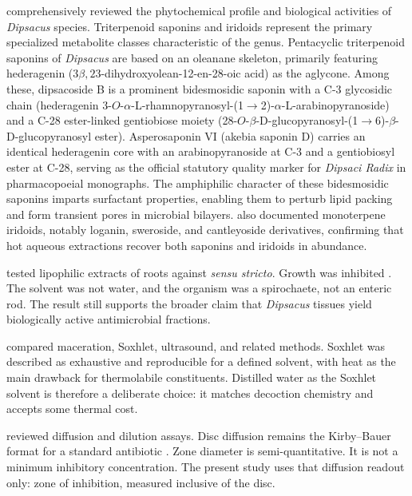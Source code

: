 \citet{zhao2011phytochemicals} comprehensively reviewed the phytochemical profile and biological activities of \textit{Dipsacus} species. Triterpenoid saponins and iridoids represent the primary specialized metabolite classes characteristic of the genus. Pentacyclic triterpenoid saponins of \textit{Dipsacus} are based on an oleanane skeleton, primarily featuring hederagenin ($3\beta,23$-dihydroxyolean-12-en-28-oic acid) as the aglycone. Among these, dipsacoside B is a prominent bidesmosidic saponin with a C-3 glycosidic chain (hederagenin 3-$O$-$\alpha$-L-rhamnopyranosyl-(1$\to$2)-$\alpha$-L-arabinopyranoside) and a C-28 ester-linked gentiobiose moiety (28-$O$-$\beta$-D-glucopyranosyl-(1$\to$6)-$\beta$-D-glucopyranosyl ester). Asperosaponin VI (akebia saponin D) carries an identical hederagenin core with an arabinopyranoside at C-3 and a gentiobiosyl ester at C-28, serving as the official statutory quality marker for \textit{Dipsaci Radix} in pharmacopoeial monographs. The amphiphilic character of these bidesmosidic saponins imparts surfactant properties, enabling them to perturb lipid packing and form transient pores in microbial bilayers. \citet{zhao2011phytochemicals} also documented monoterpene iridoids, notably loganin, sweroside, and cantleyoside derivatives, confirming that hot aqueous extractions recover both saponins and iridoids in abundance.

\citet{liebold2011growth} tested lipophilic extracts of  roots against  \textit{sensu stricto}. Growth was inhibited \invitro{}. The solvent was not water, and the organism was a spirochaete, not an enteric rod. The result still supports the broader claim that \textit{Dipsacus} tissues yield biologically active antimicrobial fractions.

\citet{azwanida2015review} compared maceration, Soxhlet, ultrasound, and related methods. Soxhlet was described as exhaustive and reproducible for a defined solvent, with heat as the main drawback for thermolabile constituents. Distilled water as the Soxhlet solvent is therefore a deliberate choice: it matches decoction chemistry and accepts some thermal cost.

\citet{balouiri2016methods} reviewed diffusion and dilution assays. Disc diffusion remains the Kirby--Bauer format for a standard antibiotic \citep{bauer1966antibiotic,clsi2024m100}. Zone diameter is semi-quantitative. It is not a minimum inhibitory concentration. The present study uses that diffusion readout only: zone of inhibition, measured inclusive of the disc.

